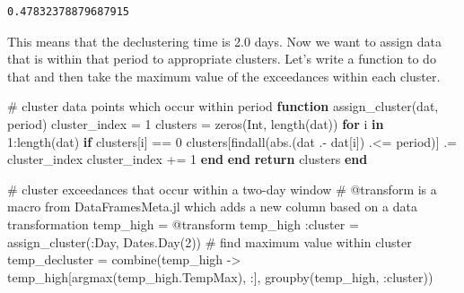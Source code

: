 \documentclass[
  letterpaper,
  DIV=11,
  numbers=noendperiod]{scrartcl}
\newenvironment{Shaded}{\begin{snugshade}}{\end{snugshade}}
\newcommand{\BuiltInTok}[1]{\textcolor[rgb]{0.00,0.23,0.31}{#1}}
\newcommand{\CommentTok}[1]{\textcolor[rgb]{0.37,0.37,0.37}{#1}}
\newcommand{\ControlFlowTok}[1]{\textcolor[rgb]{0.00,0.23,0.31}{\textbf{#1}}}
\newcommand{\DataTypeTok}[1]{\textcolor[rgb]{0.68,0.00,0.00}{#1}}
\newcommand{\FloatTok}[1]{\textcolor[rgb]{0.68,0.00,0.00}{#1}}
\newcommand{\FunctionTok}[1]{\textcolor[rgb]{0.28,0.35,0.67}{#1}}
\newcommand{\KeywordTok}[1]{\textcolor[rgb]{0.00,0.23,0.31}{\textbf{#1}}}
\newcommand{\NormalTok}[1]{\textcolor[rgb]{0.00,0.23,0.31}{#1}}
\newcommand{\OperatorTok}[1]{\textcolor[rgb]{0.37,0.37,0.37}{#1}}
\newcommand{\PreprocessorTok}[1]{\textcolor[rgb]{0.68,0.00,0.00}{#1}}
\begin{document}
\begin{verbatim}
0.47832378879687915
\end{verbatim}

This means that the declustering time is 2.0 days. Now we want to assign
data that is within that period to appropriate clusters. Let's write a
function to do that and then take the maximum value of the exceedances
within each cluster.

\begin{Shaded}
\begin{Highlighting}[]
\CommentTok{\# cluster data points which occur within period}
\KeywordTok{function} \FunctionTok{assign\_cluster}\NormalTok{(dat, period)}
\NormalTok{    cluster\_index }\OperatorTok{=} \FloatTok{1}
\NormalTok{    clusters }\OperatorTok{=} \FunctionTok{zeros}\NormalTok{(}\DataTypeTok{Int}\NormalTok{, }\FunctionTok{length}\NormalTok{(dat))}
    \ControlFlowTok{for}\NormalTok{ i }\KeywordTok{in} \FloatTok{1}\OperatorTok{:}\FunctionTok{length}\NormalTok{(dat)}
        \ControlFlowTok{if}\NormalTok{ clusters[i] }\OperatorTok{==} \FloatTok{0}
\NormalTok{            clusters[}\FunctionTok{findall}\NormalTok{(}\FunctionTok{abs}\NormalTok{.(dat }\OperatorTok{.{-}}\NormalTok{ dat[i]) }\OperatorTok{.\textless{}=}\NormalTok{ period)] }\OperatorTok{.=}\NormalTok{ cluster\_index}
\NormalTok{            cluster\_index }\OperatorTok{+=} \FloatTok{1}
        \ControlFlowTok{end}
    \ControlFlowTok{end}
    \ControlFlowTok{return}\NormalTok{ clusters}
\KeywordTok{end}

\CommentTok{\# cluster exceedances that occur within a two{-}day window}
\CommentTok{\# @transform is a macro from DataFramesMeta.jl which adds a new column based on a data transformation}
\NormalTok{temp\_high }\OperatorTok{=} \PreprocessorTok{@transform}\NormalTok{ temp\_high }\OperatorTok{:}\NormalTok{cluster }\OperatorTok{=} \FunctionTok{assign\_cluster}\NormalTok{(}\OperatorTok{:}\NormalTok{Day, }\BuiltInTok{Dates}\NormalTok{.}\FunctionTok{Day}\NormalTok{(}\FloatTok{2}\NormalTok{))}
\CommentTok{\# find maximum value within cluster}
\NormalTok{temp\_decluster }\OperatorTok{=} \FunctionTok{combine}\NormalTok{(temp\_high }\OperatorTok{{-}\textgreater{}}\NormalTok{ temp\_high[}\FunctionTok{argmax}\NormalTok{(temp\_high.TempMax), }\OperatorTok{:}\NormalTok{], }\FunctionTok{groupby}\NormalTok{(temp\_high, }\OperatorTok{:}\NormalTok{cluster))}
\end{Highlighting}
\end{Shaded}
\end{document}
